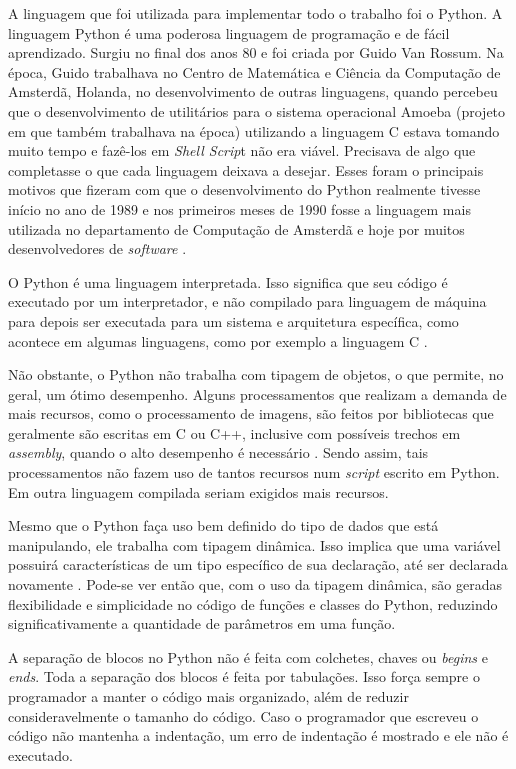 \documentclass[
	12pt,				%
	twoside,			%
	a4paper,			%
	english,			%
	french,				%
	spanish,			%
	brazil				%
	]{abntex2}
\begin{document}
A linguagem que foi utilizada para implementar todo o trabalho foi o
Python. A linguagem Python é uma poderosa linguagem de programação e de
fácil aprendizado. Surgiu no final dos anos 80 e foi criada por Guido
Van Rossum. Na época, Guido trabalhava no Centro de Matemática e Ciência
da Computação de Amsterdã, Holanda, no desenvolvimento de outras
linguagens, quando percebeu que o desenvolvimento de utilitários para o
sistema operacional Amoeba (projeto em que também trabalhava na época)
utilizando a linguagem C estava tomando muito tempo e fazê-los em
\emph{Shell Scrip}t não era viável. Precisava de algo que completasse o
que cada linguagem deixava a desejar. Esses foram o principais motivos
que fizeram com que o desenvolvimento do Python realmente tivesse início
no ano de 1989 e nos primeiros meses de 1990 fosse a linguagem mais
utilizada no departamento de Computação de Amsterdã e hoje por muitos
desenvolvedores de \emph{software} \cite{SILVA}.

O Python é uma linguagem interpretada. Isso significa que seu código é
executado por um interpretador, e não compilado para linguagem de
máquina para depois ser executada para um sistema e arquitetura
específica, como acontece em algumas linguagens, como por exemplo a
linguagem C \cite{MAGNUN}.

Não obstante, o Python não trabalha com tipagem de objetos, o que
permite, no geral, um ótimo desempenho. Alguns processamentos que
realizam a demanda de mais recursos, como o processamento de imagens,
são feitos por bibliotecas que geralmente são escritas em C ou C++,
inclusive com possíveis trechos em \emph{assembly}, quando o alto
desempenho é necessário \cite{GUIDO}. Sendo assim, tais processamentos
não fazem uso de tantos recursos num \emph{script} escrito em Python. Em
outra linguagem compilada seriam exigidos mais recursos.

Mesmo que o Python faça uso bem definido do tipo de dados que está
manipulando, ele trabalha com tipagem dinâmica. Isso implica que uma
variável possuirá características de um tipo específico de sua
declaração, até ser declarada novamente \cite{MAGNUN}. Pode-se ver então
que, com o uso da tipagem dinâmica, são geradas flexibilidade e
simplicidade no código de funções e classes do Python, reduzindo
significativamente a quantidade de parâmetros em uma função.

A separação de blocos no Python não é feita com colchetes, chaves ou
\emph{begins} e \emph{ends}. Toda a separação dos blocos é feita por
tabulações. Isso força sempre o programador a manter o código mais
organizado, além de reduzir consideravelmente o tamanho do código. Caso
o programador que escreveu o código não mantenha a indentação, um erro
de indentação é mostrado e ele não é executado.
\end{document}
